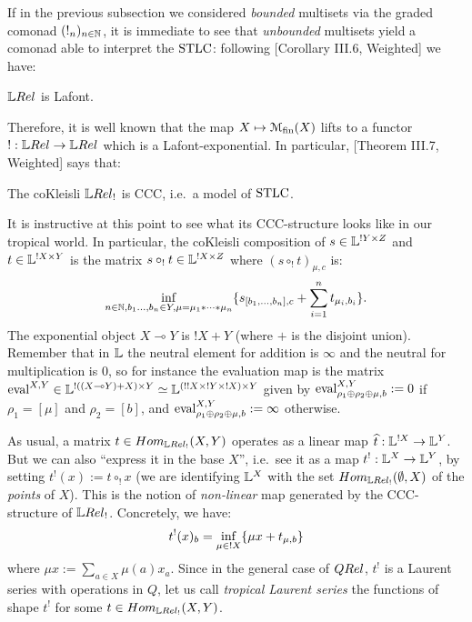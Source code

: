 
If in the previous subsection we considered \emph{bounded} multisets via the graded comonad $(!_n)_{n\in\mathbb{N}}$, it is immediate to see that \emph{unbounded} multisets yield a comonad able to interpret the $\mathrm{STLC}$:
following [Corollary III.6, Weighted] we have:

\begin{fact}
 $\LREL$ is Lafont.
\end{fact}

Therefore, it is well known that the map $X\mapsto \mathcal{M}_{\mathrm{fin}}(X)$ lifts to a functor $!:\LREL\to\LREL$ which %
is a Lafont-exponential.
In particular, [Theorem III.7, Weighted] says that:
\begin{fact}
 The coKleisli $\LREL_!$ is CCC, i.e.\ a model of $\mathrm{STLC}$.
\end{fact}

It is instructive at this point to see what its CCC-structure looks like in our tropical world.
In particular, the coKleisli composition of $s\in\mathbb{L}^{!Y\times Z}$ and $t\in\mathbb{L}^{!X\times Y}$ is the matrix $s\circ_! t\in\mathbb{L}^{!X\times Z}$ where $(s\circ_! t)_{\mu,c}$ is:
\[
 \inf\limits_{n\in\mathbb{N}, b_1\dots,b_n\in Y, \mu = \mu_1*\cdots *\mu_n}
 \{s_{[b_1,\dots,b_n],c} + \sum\limits_{i=1}^n t_{\mu_i,b_i}\}.
\]
The exponential object $X\multimap Y$ is $!X+Y$ (where $+$ is the disjoint union).
Remember that in $\mathbb{L}$ the neutral element for addition is $\infty$ and the neutral for multiplication is $0$, so for instance the evaluation map is the matrix $\mathrm{eval}^{X,Y}\in\mathbb{L}^{!((X\multimap Y) + X)\times Y}\simeq\mathbb{L}^{(!!X\times !Y\times !X)\times Y}$ given by $\mathrm{eval}^{X,Y}_{\rho_1\oplus\rho_2\oplus\mu,b}:=0$ if $\rho_1=[\mu]$ and $\rho_2=[b]$, and $\mathrm{eval}^{X,Y}_{\rho_1\oplus\rho_2\oplus\mu,b}:=\infty$ otherwise.

\begin{remark}
 As usual, a matrix $t\in\HOM{\LREL_!}{X}{Y}$ operates as a linear map $\widehat t:\mathbb{L}^{!X}\to\mathbb{L}^Y$.
 But we can also ``express it in the base $X$'', i.e.\ see it as a map $t^!:\mathbb{L}^X\to\mathbb{L}^Y$, by setting $t^!(x):=t\circ_! x$ (we are identifying $\mathbb{L}^X$ with the set $\HOM{\LREL_!}{\emptyset}{X}$ of the \emph{points} of $X$).
 This is the notion of \emph{non-linear} map generated by the CCC-structure of $\LREL_!$.
 Concretely, we have:
 \[t^!(x)_b=\inf\limits_{\mu\in !X} \{\mu x+ t_{\mu,b}\}\] where $\mu x:=\sum\limits_{a\in X} \mu(a)x_a$.
 Since in the general case of $\QREL$, $t^!$ is a Laurent series with operations in $Q$, let us call \emph{tropical Laurent series} the functions of shape $t^!$ for some $t\in\HOM{\LREL_!}{X}{Y}$.
\end{remark}

